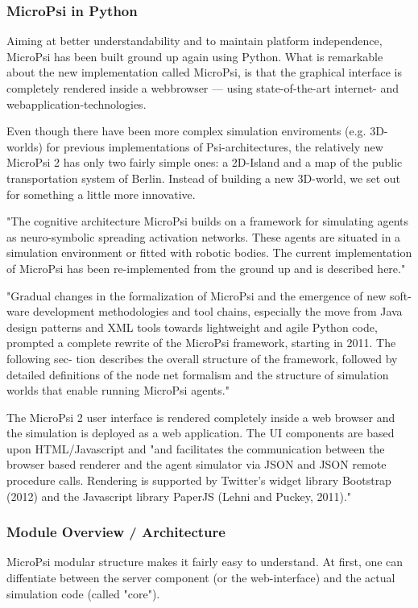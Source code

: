             \subsubsection{MicroPsi in Python}
Aiming at better understandability and to maintain platform independence, MicroPsi has been built ground up again using Python. What is remarkable about the new implementation called MicroPsi, is that the graphical interface is completely rendered inside a webbrowser --- using state-of-the-art internet- and webapplication-technologies.~\cite{conf/agi/Bach12}
        
Even though there have been more complex simulation enviroments (e.g. 3D-worlds) for previous implementations of Psi-architectures, the relatively new MicroPsi 2 has only two fairly simple ones: a 2D-Island and a map of the public transportation system of Berlin. Instead of building a new 3D-world, we set out for something a little more innovative.

"The cognitive architecture MicroPsi builds on a framework for simulating agents as neuro-symbolic spreading activation networks. These agents are situated in a simulation environment or fitted with robotic bodies. The current implementation of MicroPsi has been re-implemented from the ground up and is described here."~\cite{conf/agi/Bach12}

"Gradual changes in the formalization of MicroPsi and the emergence of new soft- ware development methodologies and tool chains, especially the move from Java design patterns and XML tools towards lightweight and agile Python code, prompted a complete rewrite of the MicroPsi framework, starting in 2011. The following sec- tion describes the overall structure of the framework, followed by detailed definitions of the node net formalism and the structure of simulation worlds that enable running MicroPsi agents."~\cite{conf/agi/Bach12}

The MicroPsi 2 user interface is rendered completely inside a web browser and the simulation is deployed as a web application. The UI components are based upon HTML/Javascript and "and facilitates the communication between the browser based renderer and the agent simulator via JSON and JSON remote procedure calls. Rendering is supported by Twitter’s widget library Bootstrap (2012) and the Javascript library PaperJS (Lehni and Puckey, 2011)."~\cite{conf/agi/Bach12}

            \subsubsection{Module Overview / Architecture}
MicroPsi modular structure makes it fairly easy to understand. At first, one can diffentiate between the server component (or the web-interface) and the actual simulation code (called "core").

